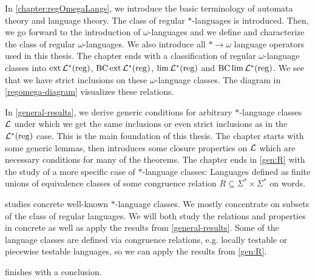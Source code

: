 In \cref{chapter:regOmegaLangs}, we introduce the basic terminology of automata theory and language theory. The class of regular $*$-languages is introduced. Then, we go forward to the introduction of $\omega$-languages and we define and characterize the class of regular $\omega$-languages. We also introduce all $* \rightarrow \omega$ language operators used in this thesis. The chapter ends with a classification of regular $\omega$-language classes into $\operatorname{ext} \mathcal{L}^*(\textup{\textrm{reg}})$, $\operatorname{BC} \operatorname{ext} \mathcal{L}^*(\textup{\textrm{reg}})$, $\lim \mathcal{L}^*(\textup{\textrm{reg}})$ and $\operatorname{BC} \lim \mathcal{L}^*(\textup{\textrm{reg}})$. We see that we have strict inclusions on these $\omega$-language classes. The diagram in \cref{regomega-diagram} visualizes these relations.

In \cref{general-results}, we derive generic conditions for arbitrary $*$-language classes $\mathcal{L}$ under which we get the same inclusions or even strict inclusions as in the $\mathcal{L}^*(\textup{\textrm{reg}})$ case. This is the main foundation of this thesis. The chapter starts with some generic lemmas, then introduces some closure properties on $\mathcal{L}$ which are necessary conditions for many of the theorems. The chapter ends in \cref{gen:R} with the study of a more specific case of $*$-language classes: Languages defined as finite unions of equivalence classes of some congruence relation $R \subseteq \Sigma^*\times\Sigma^*$ on words.

 studies concrete well-known $*$-language classes. We mostly concentrate on subsets of the class of regular languages. We will both study the relations and properties in concrete as well as apply the results from \cref{general-results}. Some of the language classes are defined via congruence relations, e.g. locally testable or piecewise testable languages, so we can apply the results from \cref{gen:R}.

 finishes with a conclusion.
